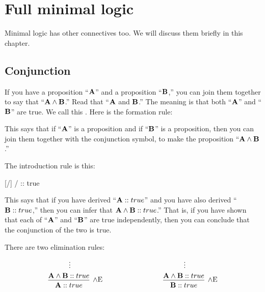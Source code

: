 \documentclass[../../../main.tex]{subfiles}
\begin{document}
\chapter{Full minimal logic}

Minimal logic has other connectives too. We will discuss them briefly in this chapter.


\section{Conjunction}

If you have a proposition ``$\mathbf{A}$'' and a proposition ``$\mathbf{B}$,'' you can join them together to say that ``$\nd{A} \conj/ \nd{B}$.'' Read that ``$\mathbf{A}$ and $\mathbf{B}$.'' The meaning is that both ``$\mathbf{A}$'' and ``$\mathbf{B}$'' are true. We call this . Here is the formation rule:

\begin{prooftree*}
\end{prooftree*}

\noindent
This says that if ``$\mathbf{A}$'' is a proposition and if ``$\mathbf{B}$'' is a proposition, then you can join them together with the conjunction symbol, to make the proposition ``$\nd{A} \conj/ \nd{B}$.''

The introduction rule is this:

\begin{prooftree*}
  \hypo{}
  \ellipsis{}{}
  \hypo{}
  \ellipsis{}{}
  [\conjIntro/]{ \conj/  :: true}
\end{prooftree*}

\noindent
This says that if you have derived ``$\mathbf{A} :: true$'' and you have also derived ``$\mathbf{B} :: true$,'' then you can infer that $\nd{A} \conj/ \nd{B} :: true$.'' That is, if you have shown that each of ``$\mathbf{A}$'' and ``$\mathbf{B}$'' are true independently, then you can conclude that the conjunction of the two is true.

There are two elimination rules:

$$
\begin{prooftree}
  \hypo{}
  \ellipsis{}{}
  \infer[no rule]1{\nd{A} \conj/ \nd{B} :: true}
  \infer1[\conjElim/]{\nd{A} :: true}
\end{prooftree}
\hskip 3cm
\begin{prooftree}
  \hypo{}
  \ellipsis{}{}
  \infer[no rule]1{\nd{A} \conj/ \nd{B} :: true}
  \infer1[\conjElim/]{\nd{B} :: true}
\end{prooftree}
$$
\end{document}
